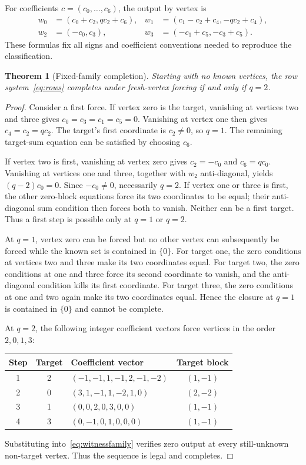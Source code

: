 \documentclass[11pt,letterpaper]{article}
\newtheorem{theorem}{Theorem}[section]
\theoremstyle{definition}
\theoremstyle{remark}\newtheorem{remark}[theorem]{Remark}
\begin{document}
For coefficients $c=(c_0,\ldots,c_6)$, the output by vertex is
\begin{align}\label{eq:witnessfamily}
w_0&=(c_0+c_2,qc_2+c_6), &
w_1&=(c_1-c_2+c_4,-qc_2+c_4),\\
w_2&=(-c_0,c_3), &
w_3&=(-c_1+c_5,-c_3+c_5).\nonumber
\end{align}
These formulas fix all signs and coefficient conventions needed to reproduce the classification.

\begin{theorem}[Fixed-family completion]\label{thm:q2}
Starting with no known vertices, the row system~\eqref{eq:rows} completes under fresh-vertex forcing if and only if $q=2$.
\end{theorem}
\begin{proof}
Consider a first force. If vertex zero is the target, vanishing at vertices two and three gives $c_0=c_3=c_1=c_5=0$. Vanishing at vertex one then gives $c_4=c_2=qc_2$. The target's first coordinate is $c_2\ne0$, so $q=1$. The remaining target-sum equation can be satisfied by choosing $c_6$.

If vertex two is first, vanishing at vertex zero gives $c_2=-c_0$ and $c_6=qc_0$. Vanishing at vertices one and three, together with $w_2$ anti-diagonal, yields $(q-2)c_0=0$. Since $-c_0\ne0$, necessarily $q=2$. If vertex one or three is first, the other zero-block equations force its two coordinates to be equal; their anti-diagonal sum condition then forces both to vanish. Neither can be a first target. Thus a first step is possible only at $q=1$ or $q=2$.

At $q=1$, vertex zero can be forced but no other vertex can subsequently be forced while the known set is contained in $\{0\}$. For target one, the zero conditions at vertices two and three make its two coordinates equal. For target two, the zero conditions at one and three force its second coordinate to vanish, and the anti-diagonal condition kills its first coordinate. For target three, the zero conditions at one and two again make its two coordinates equal. Hence the closure at $q=1$ is contained in $\{0\}$ and cannot be complete.

At $q=2$, the following integer coefficient vectors force vertices in the order $2,0,1,3$:
\begin{center}\small
\begin{tabular}{cclc}\toprule
Step&Target&Coefficient vector&Target block\\\midrule
1&2&$(-1,-1,1,-1,2,-1,-2)$&$(1,-1)$\\
2&0&$(3,1,-1,1,-2,1,0)$&$(2,-2)$\\
3&1&$(0,0,2,0,3,0,0)$&$(1,-1)$\\
4&3&$(0,-1,0,1,0,0,0)$&$(1,-1)$\\\bottomrule
\end{tabular}
\end{center}
Substituting into~\eqref{eq:witnessfamily} verifies zero output at every still-unknown non-target vertex. Thus the sequence is legal and completes.
\end{proof}
\end{document}
